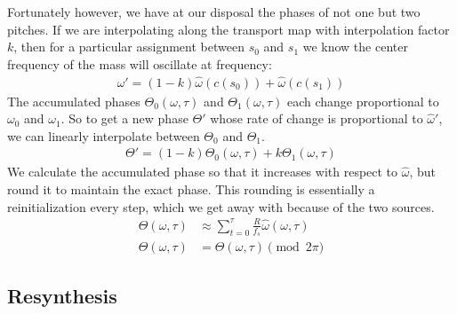 \documentclass[12pt]{article}
\begin{document}
Fortunately however, we have at our disposal the phases of not one but two pitches.
If we are interpolating along the transport map with interpolation factor $k$,
then for a particular assignment between $s_0$ and $s_1$
we know the center frequency of the mass will oscillate at frequency:
\begin{align}
  \hat{\omega}' = (1 - k)\hat{\omega}(c(s_0)) + \hat{\omega}(c(s_1))
\end{align}
The accumulated phases 
$\Theta_0(\omega, \tau)$
and
$\Theta_1(\omega, \tau)$
each change proportional to $\omega_0$
and $\omega_1$.
So to get a new phase $\Theta'$ whose rate of change is proportional to $\hat{\omega}'$, we can linearly interpolate between $\Theta_0$ and $\Theta_1$.
\begin{align}
  \Theta' = (1 - k)\Theta_0(\omega, \tau) + k\Theta_1(\omega, \tau)
\end{align}
We calculate the accumulated phase so that it increases with respect to $\hat{\omega}$, but round it to maintain the exact phase. This rounding is essentially a reinitialization every step, which we get away with because of the two sources.
\begin{align}
  \Theta(\omega, \tau) &\approx
  \sum_{t = 0}^\tau 
  \frac{R}{f_s}\hat{\omega}(\omega, \tau)\\
  \Theta(\omega, \tau) &= \Theta(\omega,\tau)\pmod{2\pi}
\end{align}

\subsection{Resynthesis}
\end{document}
